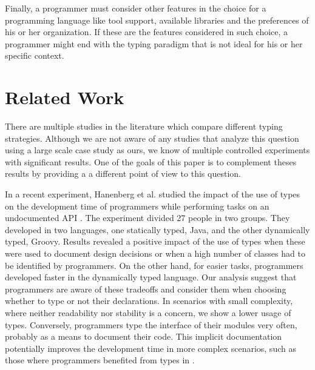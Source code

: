 \documentclass[preprint]{sigplanconf}
\begin{document}
Finally, a programmer must consider other features in the choice for a programming language like tool support, available libraries and the preferences of his or her organization.
If these are the features considered in such choice, a programmer might end with the typing paradigm that is not ideal for his or her specific context.











%
%
\section{Related Work\label{related}}
There are multiple studies in the literature which compare different typing strategies.
Although we are not aware of any studies that analyze this question using a large scale case study as ours, we know of multiple controlled experiments with significant results.
One of the goals of this paper is to complement theses results by providing a a different point of view to this question. 

In a recent experiment, Hanenberg et al. studied the impact of the use of types on the development time of programmers while performing tasks on an undocumented API \cite{Hanenberg13}.
The experiment divided 27 people in two groups.
They developed in two languages, one statically typed, Java, and the other dynamically typed, Groovy.
Results revealed a positive impact of the use of types when these were used to document design decisions or when a high number of classes had to be identified by programmers.
On the other hand, for easier tasks, programmers developed faster in the dynamically typed language.
Our analysis suggest that programmers are aware of these tradeoffs and consider them when choosing whether to type or not their declarations.
In scenarios with small complexity, where neither readability nor stability is a concern, we show a lower usage of types.
Conversely, programmers type the interface of their modules very often, probably as a means to document their code.
This implicit documentation potentially improves the development time in more complex scenarios, such as those where programmers benefited from types in \cite{Hanenberg13}.
\end{document}
